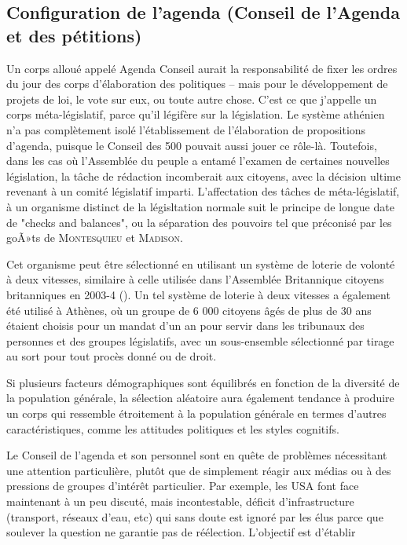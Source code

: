 \subsection{Configuration de l'agenda (Conseil de l'Agenda et des pétitions)}
Un corps alloué appelé Agenda Conseil aurait la responsabilité de
fixer les ordres du jour des corps d'élaboration des politiques --
mais pour le développement de projets de loi, le vote sur eux, ou
toute autre chose. C'est ce que j'appelle un corps méta-législatif,
parce qu'il légifère sur la législation. Le système athénien n'a pas
complètement isolé l'établissement de l'élaboration de propositions
d'agenda, puisque le Conseil des 500 pouvait aussi jouer ce
rôle-là. Toutefois, dans les cas où l'Assemblée du peuple a entamé
l'examen de certaines nouvelles législation, la tâche de rédaction
incomberait aux citoyens, avec la décision ultime revenant à un comité
législatif imparti. L'affectation des tâches de méta-législatif, à un
organisme distinct de la législtation normale suit le principe de
longue date de "checks and balances", ou la séparation des pouvoirs
tel que préconisé par les goÃ»ts de \textsc{Montesquieu} et
\textsc{Madison}.\par
Cet organisme peut être sélectionné en utilisant un système de loterie
de volonté à deux vitesses, similaire à celle utilisée dans
l'Assemblée Britannique citoyens britanniques en 2003-4 (\cite{herath07:_real_power_peopl}). Un tel système de loterie à deux vitesses a également été
utilisé à Athènes, où un groupe de 6 000 citoyens âgés de plus de 30
ans étaient choisis pour un mandat d'un an pour servir dans les
tribunaux des personnes et des groupes législatifs, avec un
sous-ensemble sélectionné par tirage au sort pour tout procès
donné ou de droit.\par
Si plusieurs facteurs démographiques sont équilibrés en fonction de la
diversité de la population générale, la sélection aléatoire aura
également tendance à produire un corps qui ressemble étroitement à la
population générale en termes d'autres caractéristiques, comme les
attitudes politiques et les styles cognitifs.\par
Le Conseil de l'agenda et son personnel sont en quête de
problèmes nécessitant une attention particulière, plutôt que de
simplement réagir aux médias ou à des pressions de groupes d'intérêt
particulier. Par exemple, les USA font face maintenant à un peu discuté,
mais incontestable, déficit d'infrastructure (transport, réseaux
d'eau, etc) qui sans doute est ignoré par les élus parce que soulever
la question ne garantie pas de réélection. L'objectif est d'établir
